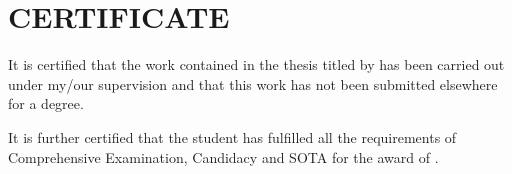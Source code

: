 \chapter*{\centering\normalsize CERTIFICATE}

It is certified that the work contained in the thesis titled \textbf{\thetitle{}} by \textbf{\theauthor{}} has been carried out under my/our supervision and that this work has not been submitted elsewhere for a degree.

It is further certified that the student has fulfilled all the requirements of Comprehensive Examination, Candidacy and SOTA for the award of \textbf{\degree{}}.

\vspace{3cm}

